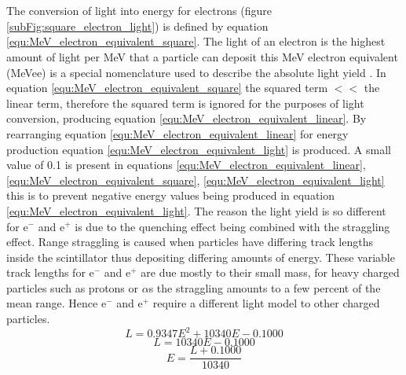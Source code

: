 \\\\The conversion of light into energy for electrons (figure \ref{subFig:square_electron_light}) is defined by equation \ref{equ:MeV_electron_equivalent_square}. The light of an electron is the highest amount of light per MeV that a particle can deposit this MeV electron equivalent (MeVee) is a special nomenclature used to describe the absolute light yield \cite{knoll_2010}. In equation \ref{equ:MeV_electron_equivalent_square} the squared term $ << $ the linear term, therefore the squared term is ignored for the purposes of light conversion, producing equation \ref{equ:MeV_electron_equivalent_linear}. By rearranging equation \ref{equ:MeV_electron_equivalent_linear} for energy production equation \ref{equ:MeV_electron_equivalent_light} is produced. A small value of 0.1 is present in equations \ref{equ:MeV_electron_equivalent_linear}, \ref{equ:MeV_electron_equivalent_square}, \ref{equ:MeV_electron_equivalent_light} this is to prevent negative energy values being produced in equation \ref{equ:MeV_electron_equivalent_light}. The reason the light yield is so different for e$^-$ and e$^+$ is due to the quenching effect being combined with the straggling effect. Range straggling is caused when particles have differing track lengths inside the scintillator thus depositing differing amounts of energy. These variable track lengths for e$^-$ and e$^+$ are due mostly to their small mass, for heavy charged particles such as protons or $\alpha$s the straggling amounts to a few percent of the mean range\cite{knoll_2010}. Hence e$^-$ and e$^+$ require a different light model to other charged particles.
\begin{equation}
L = 0.9347E^2 + 10340E - 0.1000
\label{equ:MeV_electron_equivalent_square}
\end{equation}
\begin{equation}
L = 10340E - 0.1000
\label{equ:MeV_electron_equivalent_linear}
\end{equation}
\begin{equation}
E = \frac{L +0.1000}{10340} 
\label{equ:MeV_electron_equivalent_light}
\end{equation}


